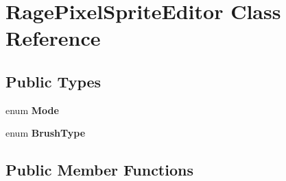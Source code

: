 \hypertarget{class_rage_pixel_sprite_editor}{\section{Rage\-Pixel\-Sprite\-Editor Class Reference}
\label{class_rage_pixel_sprite_editor}
}
\subsection*{Public Types}
\begin{DoxyCompactItemize}
\item 
enum {\bfseries Mode} 
\item 
enum {\bfseries Brush\-Type} 
\end{DoxyCompactItemize}
\subsection*{Public Member Functions}
